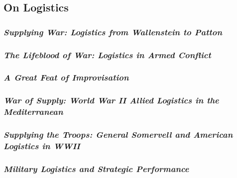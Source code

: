 \documentclass[noraggedright]{turabian-researchpaper}
\begin{document}
	\subsection{On Logistics}


		\subsubsection{\textit{Supplying War:  Logistics from
			Wallenstein to Patton}}
		\subsubsection{\textit{The Lifeblood of War: Logistics in
			Armed Conflict}}
		\subsubsection{\textit{A Great Feat of Improvisation}}


		\subsubsection{\textit{War of Supply:  World War II Allied
			Logistics in the Mediterranean}}
		\subsubsection{\textit{Supplying the Troops:  General 
			Somervell and American Logistics in WWII}}
		\subsubsection{\textit{Military Logistics and Strategic 
			Performance}}
\end{document}
